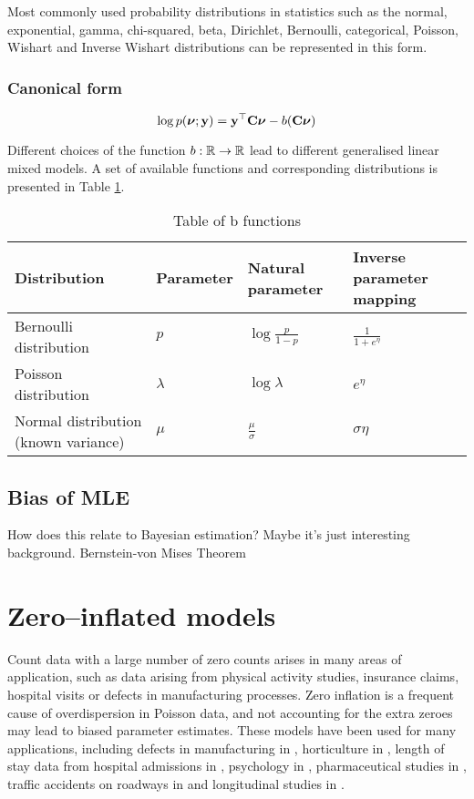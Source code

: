 \documentclass{amsart}[12pt]
\begin{document}
Most commonly used probability distributions in statistics such as the normal, exponential, gamma,
chi-squared, beta, Dirichlet, Bernoulli, categorical, Poisson, Wishart and Inverse Wishart distributions can
be represented in this form.

\subsubsection{Canonical form}
\[
	\log p({\boldsymbol \nu}; {\bf y}) = {\bf y}^\top {\bf C} {\boldsymbol\nu} - b({\bf C} {\boldsymbol \nu})
\]

Different choices of the function $b:{\mathbb{R}} \to {\mathbb{R}}$ lead to different generalised linear mixed models. A set
of available functions and corresponding distributions is presented in Table \ref{tab:b_functions}.

\begin{table}
	\caption{Table of b functions}
	\label{tab:b_functions}
	\begin{tabular}{|l|lll|}
		\hline
		Distribution                         & Parameter & Natural parameter       & Inverse parameter mapping \\
		\hline
		Bernoulli distribution               & $p$       & $\log{\frac{p}{1 - p}}$ & $\frac{1}{1 + e^\eta}$    \\
		Poisson distribution                 & $\lambda$ & $\log \lambda$          & $e^\eta$                  \\
		Normal distribution (known variance) & $\mu$     & $\frac{\mu}{\sigma}$    & $\sigma \eta$             \\
		\hline
	\end{tabular}
\end{table}

\subsection{Bias of MLE}

How does this relate to Bayesian estimation? Maybe it's just interesting background.
Bernstein-von Mises Theorem

\section{Zero--inflated models}
Count data with a large number of zero counts arises in many areas of application, such as data arising from
physical activity studies, insurance claims, hospital visits or defects in manufacturing processes. Zero
inflation is a frequent cause of overdispersion in Poisson data, and not accounting for the extra zeroes
may lead to biased parameter estimates. These models have been used for many applications, including defects
in manufacturing in \citep{lambert1992}, horticulture in \citep{BIOM:BIOM1030}, length of
stay data from hospital admissions in \citep{BIMJ:BIMJ200390024}, psychology in \citep{JOFP:rethink},
pharmaceutical studies in \citep{Min01042005}, traffic accidents on roadways in \citep{Shankar1997829} and
longitudinal studies in \citep{LeeWangScottYauMcLachlan2006}.
\end{document}
